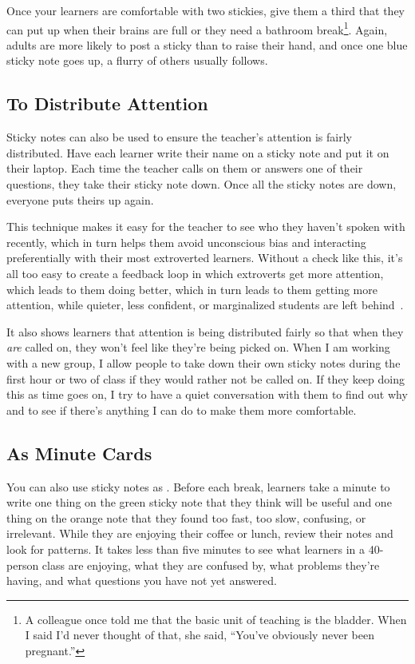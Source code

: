 Once your learners are comfortable with two stickies,
give them a third that they can put up when their brains are full
or they need a bathroom break\footnote{A colleague once told me that
the basic unit of teaching is the bladder.
When I said I'd never thought of that,
she said, ``You've obviously never been pregnant.''}.
Again,
adults are more likely to post a sticky than to raise their hand,
and once one blue sticky note goes up,
a flurry of others usually follows.

\subsection*{To Distribute Attention}

Sticky notes can also be used to ensure the teacher's attention is fairly distributed.
Have each learner write their name on a sticky note
and put it on their laptop.
Each time the teacher calls on them or answers one of their questions,
they take their sticky note down.
Once all the sticky notes are down,
everyone puts theirs up again.

This technique makes it easy for the teacher to see who they haven't spoken with recently,
which in turn helps them avoid unconscious bias
and interacting preferentially with their most extroverted learners.
Without a check like this,
it's all too easy to create a feedback loop in which extroverts get more attention,
which leads to them doing better,
which in turn leads to them getting more attention,
while quieter, less confident, or marginalized students are left behind~\cite{Alvi1999,Juss2005}.

It also shows learners that attention is being distributed fairly
so that when they \emph{are} called on,
they won't feel like they're being picked on.
When I am working with a new group,
I allow people to take down their own sticky notes
during the first hour or two of class
if they would rather not be called on.
If they keep doing this as time goes on,
I try to have a quiet conversation with them to find out why
and to see if there's anything I can do to make them more comfortable.

\subsection*{As Minute Cards}

You can also use sticky notes as .
Before each break,
learners take a minute to write one thing on the green sticky note
that they think will be useful
and one thing on the orange note
that they found too fast,
too slow,
confusing,
or irrelevant.
While they are enjoying their coffee or lunch,
review their notes and look for patterns.
It takes less than five minutes to see what learners in a 40-person class are enjoying,
what they are confused by,
what problems they're having,
and what questions you have not yet answered.


